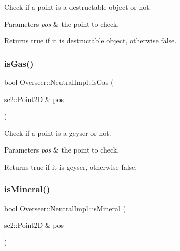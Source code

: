 Check if a point is a destructable object or not. 


\begin{DoxyParams}{Parameters}
{\em pos} & the point to check. \\
\hline
\end{DoxyParams}
\begin{DoxyReturn}{Returns}
true if it is destructable object, otherwise false. 
\end{DoxyReturn}
\mbox{\label{structOverseer_1_1NeutralImpl_a803959fe80b2b6bb14444a639b89acd5}} 
\subsubsection{\texorpdfstring{is\+Gas()}{isGas()}}
{\footnotesize\ttfamily bool Overseer\+::\+Neutral\+Impl\+::is\+Gas (\begin{DoxyParamCaption}\item[{sc2\+::\+Point2D \&}]{pos }\end{DoxyParamCaption})}



Check if a point is a geyser or not. 


\begin{DoxyParams}{Parameters}
{\em pos} & the point to check. \\
\hline
\end{DoxyParams}
\begin{DoxyReturn}{Returns}
true if it is geyser, otherwise false. 
\end{DoxyReturn}
\mbox{\label{structOverseer_1_1NeutralImpl_a6bb0b123b5db8ab4285715d71a4d7e5b}} 
\subsubsection{\texorpdfstring{is\+Mineral()}{isMineral()}}
{\footnotesize\ttfamily bool Overseer\+::\+Neutral\+Impl\+::is\+Mineral (\begin{DoxyParamCaption}\item[{sc2\+::\+Point2D \&}]{pos }\end{DoxyParamCaption})}



